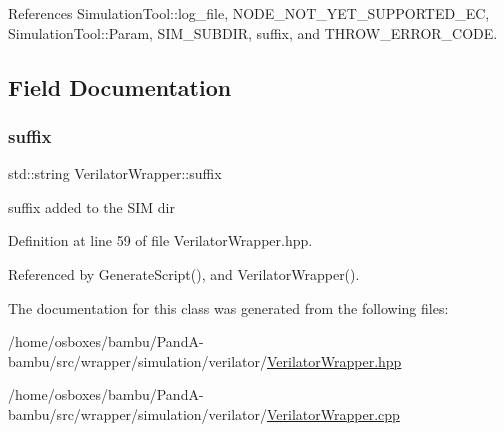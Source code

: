 References Simulation\+Tool\+::log\+\_\+file, N\+O\+D\+E\+\_\+\+N\+O\+T\+\_\+\+Y\+E\+T\+\_\+\+S\+U\+P\+P\+O\+R\+T\+E\+D\+\_\+\+EC, Simulation\+Tool\+::\+Param, S\+I\+M\+\_\+\+S\+U\+B\+D\+IR, suffix, and T\+H\+R\+O\+W\+\_\+\+E\+R\+R\+O\+R\+\_\+\+C\+O\+DE.



\subsection{Field Documentation}
\mbox{\label{classVerilatorWrapper_af3697ee97f7a93c117e04695a0aa6e70}} 
\subsubsection{\texorpdfstring{suffix}{suffix}}
{\footnotesize\ttfamily std\+::string Verilator\+Wrapper\+::suffix\hspace{0.3cm}{\ttfamily [private]}}



suffix added to the S\+IM dir 



Definition at line 59 of file Verilator\+Wrapper.\+hpp.



Referenced by Generate\+Script(), and Verilator\+Wrapper().



The documentation for this class was generated from the following files\+:\begin{DoxyCompactItemize}
\item 
/home/osboxes/bambu/\+Pand\+A-\/bambu/src/wrapper/simulation/verilator/\hyperlink{VerilatorWrapper_8hpp}{Verilator\+Wrapper.\+hpp}\item 
/home/osboxes/bambu/\+Pand\+A-\/bambu/src/wrapper/simulation/verilator/\hyperlink{VerilatorWrapper_8cpp}{Verilator\+Wrapper.\+cpp}\end{DoxyCompactItemize}

